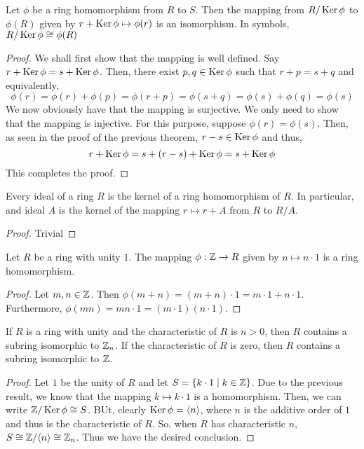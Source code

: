 \begin{proposition}
	Let $\phi$ be a ring homomorphism from $R$ to $S$. Then the mapping from $R/\operatorname{Ker}\phi$ to $\phi(R)$ given by $r+\operatorname{Ker}\phi\mapsto\phi(r)$ is an isomorphism. In symbols, $R/\operatorname{Ker}\phi\cong\phi(R)$
\end{proposition}
\begin{proof}
	We shall first show that the mapping is well defined. Say $r+\operatorname{Ker}\phi=s+\operatorname{Ker}\phi$. Then, there exist $p,q\in\operatorname{Ker}\phi$ such that $r+p=s+q$ and equivalently, 
	\begin{equation*}
		\phi(r) = \phi(r)+\phi(p) = \phi(r+p) = \phi(s+q) = \phi(s)+\phi(q) = \phi(s)
	\end{equation*}
	We now obviously have that the mapping is surjective. We only need to show that the mapping is injective. For this purpose, suppose $\phi(r) = \phi(s)$. Then, as seen in the proof of the previous theorem, $r-s\in\operatorname{Ker}\phi$ and thus, 
	\begin{equation*}
		r+\operatorname{Ker}\phi = s+(r-s)+\operatorname{Ker}\phi = s+\operatorname{Ker}\phi
	\end{equation*}
	This completes the proof.
\end{proof}

\begin{proposition}
	Every ideal of a ring $R$ is the kernel of a ring homomorphism of $R$. In particular, and ideal $A$ is the kernel of the mapping $r\mapsto r+A$ from $R$ to $R/A$.
\end{proposition}
\begin{proof}
	Trivial
\end{proof}

\begin{proposition}
	Let $R$ be a ring with unity $1$. The mapping $\phi:\mathbb{Z}\to R$ given by $n\mapsto n\cdot1$ is a ring homomorphism.
\end{proposition}
\begin{proof}
	Let $m,n\in\mathbb{Z}$. Then $\phi(m+n) = (m+n)\cdot1 = m\cdot1+n\cdot1$. Furthermore, $\phi(mn) = mn\cdot1 = (m\cdot1)(n\cdot1)$.
\end{proof}

\begin{corollary}
	If $R$ is a ring with unity and the characteristic of $R$ is $n>0$, then $R$ contains a subring isomorphic to $\mathbb{Z}_n$. If the characteristic of $R$ is zero, then $R$ contains a subring isomorphic to $\mathbb{Z}$.
\end{corollary}
\begin{proof}
	Let $1$ be the unity of $R$ and let $S = \{k\cdot1\mid k\in\mathbb{Z}\}$. Due to the previous result, we know that the mapping $k\mapsto k\cdot1$ is a homomorphism. Then, we can write $\mathbb{Z}/\operatorname{Ker}\phi\cong S$. BUt, clearly $\operatorname{Ker}\phi=\langle n\rangle$, where $n$ is the additive order of $1$ and thus is the characteristic of $R$. So, when $R$ has characteristic $n$, $S\cong\mathbb{Z}/\langle n\rangle\cong\mathbb{Z}_n$. Thus we have the desired conclusion.
\end{proof}

